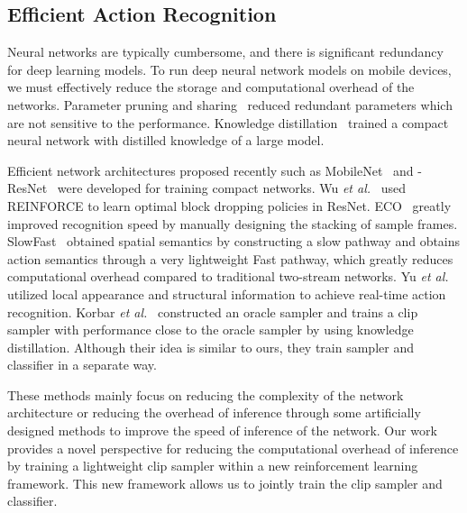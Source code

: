 \documentclass[journal]{IEEEtran}
\begin{document}
\subsection{Efficient Action Recognition}
Neural networks are typically cumbersome, and there is significant redundancy for deep learning models.
To run deep neural network models on mobile devices, we must effectively reduce the storage and computational overhead of the networks.
Parameter pruning and sharing~\cite{SrinivasB15,HanPTD15,ChenWTWC15,LebedevL16,WuNKRDGF18} reduced redundant parameters which are not sensitive to the performance.
Knowledge distillation~\cite{HintonVD15,RomeroBKCGB14,BalanRMW15,LuoZLWT16,ChenGS15} trained a compact neural network with distilled knowledge of a large model.

Efficient network architectures proposed recently such as MobileNet~\cite{HowardZCKWWAA17} and -ResNet~\cite{YuYR18} were developed for training compact networks.
Wu \emph{et al.}~\cite{WuNKRDGF18} used REINFORCE to learn optimal block dropping policies in ResNet.
ECO~\cite{ZolfaghariSB18} greatly improved recognition speed by manually designing the stacking of sample frames.
SlowFast~\cite{Feichtenhofer0M19} obtained spatial semantics by constructing a slow pathway and obtains action semantics through a very lightweight Fast pathway, which greatly reduces computational overhead compared to traditional two-stream networks.
Yu \emph{et al.}~\cite{YuKC10} utilized local appearance and structural information to achieve real-time action recognition.
Korbar \emph{et al.}~\cite{SCSampler} constructed an oracle sampler and trains a clip sampler with performance close to the oracle sampler by using knowledge distillation. Although their idea is similar to ours, they train sampler and classifier in a separate way.

These methods mainly focus on reducing the complexity of the network architecture or reducing the overhead of inference through some artificially designed methods to improve the speed of inference of the network.
Our work provides a novel perspective for reducing the computational overhead of inference by training a lightweight clip sampler within a new reinforcement learning framework. This new framework allows us to jointly train the clip sampler and classifier.
\end{document}
